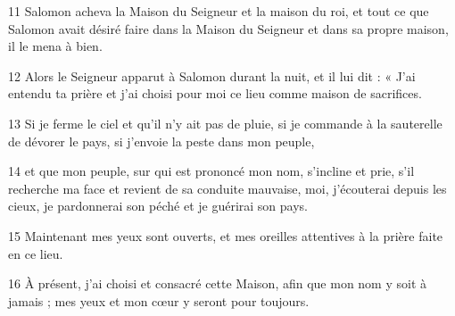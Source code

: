 
11 Salomon acheva la Maison du Seigneur et la maison du roi, et tout ce que Salomon avait désiré faire dans la Maison du Seigneur et dans sa propre maison, il le mena à bien.

12 Alors le Seigneur apparut à Salomon durant la nuit, et il lui dit : « J’ai entendu ta prière et j’ai choisi pour moi ce lieu comme maison de sacrifices.

13 Si je ferme le ciel et qu’il n’y ait pas de pluie, si je commande à la sauterelle de dévorer le pays, si j’envoie la peste dans mon peuple,

14 et que mon peuple, sur qui est prononcé mon nom, s’incline et prie, s’il recherche ma face et revient de sa conduite mauvaise, moi, j’écouterai depuis les cieux, je pardonnerai son péché et je guérirai son pays.

15 Maintenant mes yeux sont ouverts, et mes oreilles attentives à la prière faite en ce lieu.

16 À présent, j’ai choisi et consacré cette Maison, afin que mon nom y soit à jamais ; mes yeux et mon cœur y seront pour toujours.